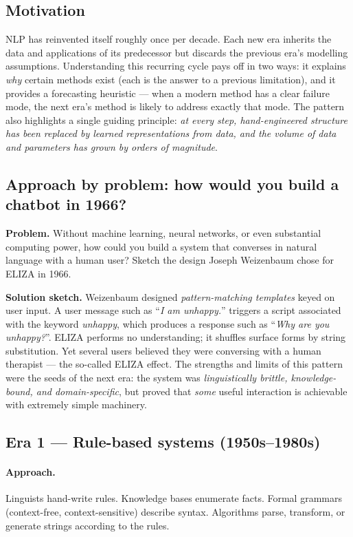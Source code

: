 \subsection{Motivation}
NLP has reinvented itself roughly once per decade. Each new era inherits the data and applications of its predecessor but discards the previous era's modelling assumptions. Understanding this recurring cycle pays off in two ways: it explains \emph{why} certain methods exist (each is the answer to a previous limitation), and it provides a forecasting heuristic --- when a modern method has a clear failure mode, the next era's method is likely to address exactly that mode. The pattern also highlights a single guiding principle: \emph{at every step, hand-engineered structure has been replaced by learned representations from data, and the volume of data and parameters has grown by orders of magnitude}.

\subsection{Approach by problem: how would you build a chatbot in 1966?}
\textbf{Problem.} Without machine learning, neural networks, or even substantial computing power, how could you build a system that converses in natural language with a human user? Sketch the design Joseph Weizenbaum chose for ELIZA in 1966.

\textbf{Solution sketch.} Weizenbaum designed \emph{pattern-matching templates} keyed on user input. A user message such as ``\emph{I am unhappy.}'' triggers a script associated with the keyword \emph{unhappy}, which produces a response such as ``\emph{Why are you unhappy?}''. ELIZA performs no understanding; it shuffles surface forms by string substitution. Yet several users believed they were conversing with a human therapist --- the so-called ELIZA effect. The strengths and limits of this pattern were the seeds of the next era: the system was \emph{linguistically brittle, knowledge-bound, and domain-specific}, but proved that \emph{some} useful interaction is achievable with extremely simple machinery.

\subsection{Era 1 --- Rule-based systems (1950s--1980s)}

\paragraph{Approach.} Linguists hand-write rules. Knowledge bases enumerate facts. Formal grammars (context-free, context-sensitive) describe syntax. Algorithms parse, transform, or generate strings according to the rules.

